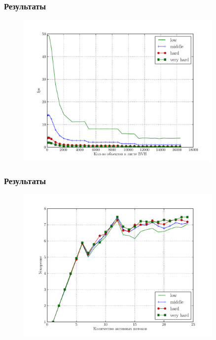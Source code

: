 \documentclass[utf8, 12pt]{beamer}
\begin{document}
\begin{frame}
\frametitle{Результаты}
\begin{figure}[H]
\centering
\includegraphics[width=0.9\textwidth]{perf/performance_bvh.pdf}
\end{figure}

\end{frame}

\begin{frame}
\frametitle{Результаты}
\begin{figure}[H]
\centering
\includegraphics[width=0.9\textwidth]{perf/table_perf_eff.pdf}
\end{figure}
\end{frame}
\end{document}
